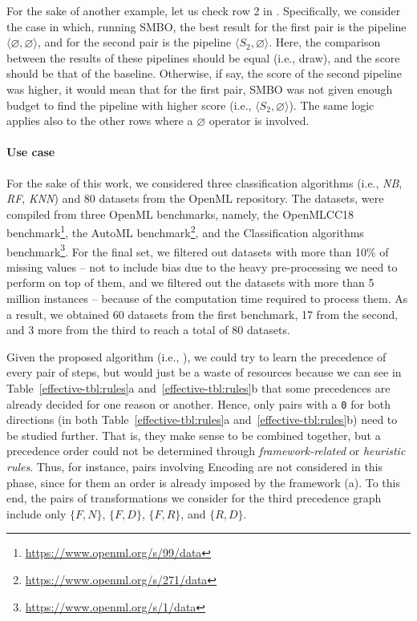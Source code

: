 For the sake of another example, let us check row 2 in .
Specifically, we consider the case in which, running SMBO, the best result for the first pair is the pipeline $\langle \varnothing, \varnothing \rangle$, and for the second pair is the pipeline $\langle S_2, \varnothing \rangle$.
Here, the comparison between the results of these pipelines should be equal (i.e., draw), and the score should be that of the baseline.
Otherwise, if say, the score of the second pipeline was higher, it would mean that for the first pair, SMBO was not given enough budget to find the pipeline with higher score (i.e., $\langle S_2, \varnothing \rangle$).
The same logic applies also to the other rows where a $\varnothing$ operator is involved.

\paragraph{Use case}
For the sake of this work, we considered three classification algorithms (i.e., \textit{NB}, \textit{RF},  \textit{KNN}) and $80$ datasets from the OpenML repository. The datasets, were compiled from three OpenML benchmarks, namely, the OpenMLCC18 benchmark\footnote{\url{https://www.openml.org/s/99/data}}, the AutoML benchmark\footnote{\url{https://www.openml.org/s/271/data}}, and the Classification algorithms benchmark\footnote{\url{https://www.openml.org/s/1/data}}.
For the final set, we filtered out datasets with more than 10\% of missing values -- not to include bias due to the heavy pre-processing we need to perform on top of them, and we filtered out the datasets with more than 5 million instances -- because of the computation time required to process them.
As a result, we obtained 60 datasets from the first benchmark, 17 from the second, and 3 more from the third to reach a total of 80 datasets.

Given the proposed algorithm (i.e., ), we could try to learn the precedence of every pair of steps, but would just be a waste of resources because we can see in Table~\ref{effective-tbl:rules}a and~\ref{effective-tbl:rules}b that some precedences are already decided for one reason or another.
Hence, only pairs with a \texttt{0} for both directions (in both Table~\ref{effective-tbl:rules}a and~\ref{effective-tbl:rules}b) need to be studied further.
That is, they make sense to be combined together, but a precedence order could not be determined through \textit{framework-related} or \textit{heuristic rules}. %
Thus, for instance, pairs involving Encoding are not considered in this phase, since for them an order is already imposed by the framework (a).
To this end, the pairs of transformations we consider for the third precedence graph include only $\{F,N\}$, $\{F,D\}$, $\{F,R\}$, and $\{R,D\}$.


